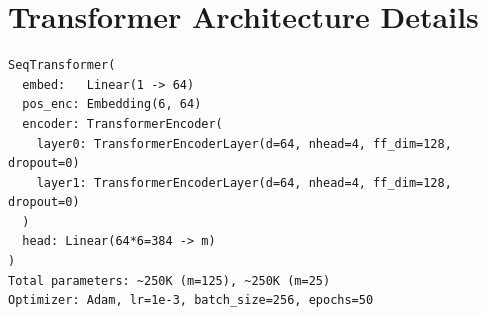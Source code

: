 \documentclass[11pt]{article}
\theoremstyle{plain}
\theoremstyle{definition}
\begin{document}
\section{Transformer Architecture Details}
\label{app:transformer}

\begin{verbatim}
SeqTransformer(
  embed:   Linear(1 -> 64)
  pos_enc: Embedding(6, 64)
  encoder: TransformerEncoder(
    layer0: TransformerEncoderLayer(d=64, nhead=4, ff_dim=128, dropout=0)
    layer1: TransformerEncoderLayer(d=64, nhead=4, ff_dim=128, dropout=0)
  )
  head: Linear(64*6=384 -> m)
)
Total parameters: ~250K (m=125), ~250K (m=25)
Optimizer: Adam, lr=1e-3, batch_size=256, epochs=50
\end{verbatim}


\end{document}
